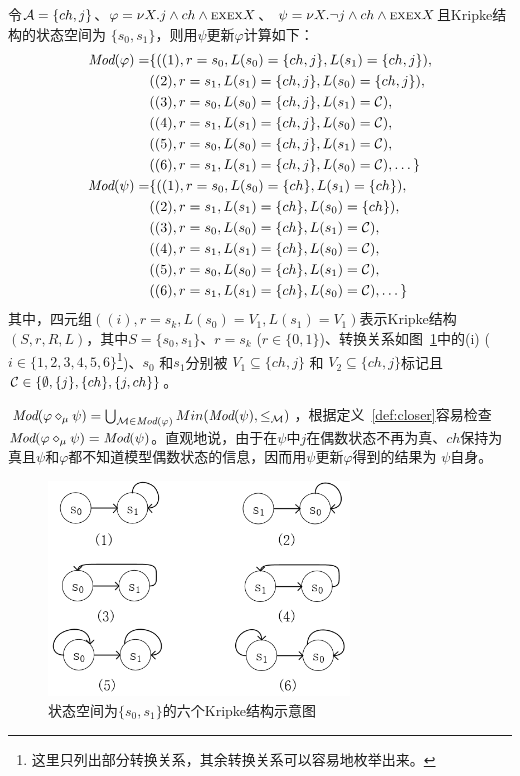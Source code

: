 \begin{example}
	令${\cal A}=\{ch, j\}$、$\varphi = \nu X. j \wedge ch \wedge \textsc{e} \textsc{x} \textsc{e} \textsc{x} X$、 $\psi= \nu X. \neg j \wedge ch \wedge \textsc{e} \textsc{x} \textsc{e} \textsc{x} X$且Kripke结构的状态空间为 $\{s_0,s_1\}$，则用$\psi$更新$\varphi$计算如下：
	\begin{align*}
		\textit{Mod}(\varphi) = & \{((1), r=s_0, L(s_0)=\{ch,j\}, L(s_1)=\{ch,j\}), \\
		& ((2),  r=s_1, L(s_1)=\{ch,j\}, L(s_0)=\{ch,j\}),\\
		& ((3),  r=s_0, L(s_0)=\{ch,j\}, L(s_1)={\cal C}), \\
		& ((4),  r=s_1, L(s_1)=\{ch,j\}, L(s_0)={\cal C}), \\
		& ((5),  r=s_0, L(s_0)=\{ch,j\}, L(s_1)={\cal C}), \\
		& ((6),  r=s_1, L(s_1)=\{ch,j\}, L(s_0)={\cal C}), \dots\}\\
		\textit{Mod}(\psi) = & \{((1), r=s_0, L(s_0)=\{ch\}, L(s_1)=\{ch\}),\\
		& ((2), r=s_1, L(s_1)=\{ch\}, L(s_0)=\{ch\}),\\
		& ((3), r=s_0, L(s_0)=\{ch\}, L(s_1)={\cal C}),\\
		& ((4), r=s_1, L(s_1)=\{ch\}, L(s_0)={\cal C}), \\
		& ((5), r=s_0, L(s_0)=\{ch\}, L(s_1)={\cal C}),\\
		& ((6), r=s_1, L(s_1)=\{ch\}, L(s_0)={\cal C}), \dots\}
	\end{align*}
	其中，四元组$((i), r= s_k, L(s_0)=V_1, L(s_1)=V_1)$表示Kripke结构$(S,r,R,L)$，其中$S=\{s_0, s_1\}$、$r=s_k$ ($r\in \{0,1\}$)、转换关系如图~\ref{fig:knoup}中的(i) ($i \in \{1,2,3,4,5,6\}$\footnote{这里只列出部分转换关系，其余转换关系可以容易地枚举出来。})、$s_0$ 和$s_1$分别被 $V_1 \subseteq \{ch,j\}$ 和 $V_2\subseteq \{ch,j\}$标记且${\cal C} \in \{\emptyset, \{j\}, \{ch\}, \{j,ch\}\}$。
	
	$\textit{Mod}(\varphi \diamond_{\mu} \psi) = \bigcup_{{\cal M}\in \textit{Mod}(\varphi)} Min(\textit{Mod}(\psi), \leq_{{\cal M}})$，根据定义~\ref{def:closer}容易检查$\textit{Mod}(\varphi \diamond_{\mu} \psi) = \textit{Mod}(\psi)$。直观地说，由于在$\psi$中$j$在偶数状态不再为真、$ch$保持为真且$\psi$和$\varphi$都不知道模型偶数状态的信息，因而用$\psi$更新$\varphi$得到的结果为 $\psi$自身。
	\begin{figure}[h]%
		\centering
		\includegraphics[width=8cm]{knowledge_update.png}
		\caption{状态空间为$\{s_0,s_1\}$的六个Kripke结构示意图}\label{fig:knoup}
		
	\end{figure}
\end{example}


